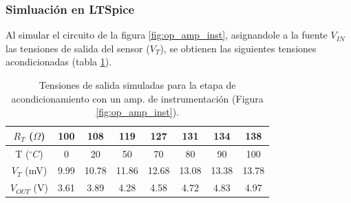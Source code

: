 \documentclass[journal,trans]{IEEEtran}
\begin{document}
\subsubsection{Simluación en LTSpice}
Al simular el circuito de la figura \ref{fig:op_amp_inst}, asignandole a la fuente $V_{IN}$ las tensiones de salida del sensor ($V_{T}$), se obtienen las siguientes tensiones acondicionadas (tabla \ref{tab:tensiones_salida_simuladas_instr}).

\begin{table}[htb]
    \begin{center}
        \caption{Tensiones de salida simuladas para la etapa de acondicionamiento con un amp. de instrumentación (Figura \ref{fig:op_amp_inst}).}
        \label{tab:tensiones_salida_simuladas_instr}
        \begin{tabular}{c | c | c | c | c | c | c | c}
            \hline
            $R_{T}$ ($\Omega$) & 100 & 108 & 119 & 127 & 131 & 134 & 138 \\
            \hline
            T ($^{\circ}C$) & 0 & 20 & 50 & 70 & 80 & 90 & 100 \\
            \hline
            $V_{T}$ (mV) & 9.99 & 10.78 & 11.86 & 12.68 & 13.08 & 13.38 & 13.78 \\
            \hline
            $V_{OUT}$ (V) & 3.61 & 3.89 & 4.28 & 4.58 & 4.72 & 4.83 & 4.97 \\
            \hline
        \end{tabular}
    \end{center}
\end{table}





%
%
%
\end{document}
